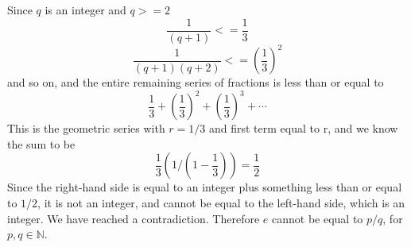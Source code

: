 \documentclass[11pt, oneside]{article}
\begin{document}
Since $q$ is an integer and $q >= 2$
\[ \frac{1}{(q+1)} <= \frac{1}{3} \]
\[ \frac{1}{(q+1)(q+2)} <= (\frac{1}{3})^2 \]
and so on, and the entire remaining series of fractions is less than or equal to
\[ \frac{1}{3} + (\frac{1}{3})^2 + (\frac{1}{3})^3 + \cdots \]
This is the geometric series with $r = 1/3$ and first term equal to r, and we know the sum to be
\[ \frac{1}{3} ( 1 / (1-\frac{1}{3}) ) = \frac{1}{2} \]
Since the right-hand side is equal to an integer plus something less than or equal to $1/2$, it is not an integer, and cannot be equal to the left-hand side, which is an integer.  We have reached a contradiction.  Therefore $e$ cannot be equal to $p/q$, for $p,q \in \mathbb{N}$.
\end{document}
